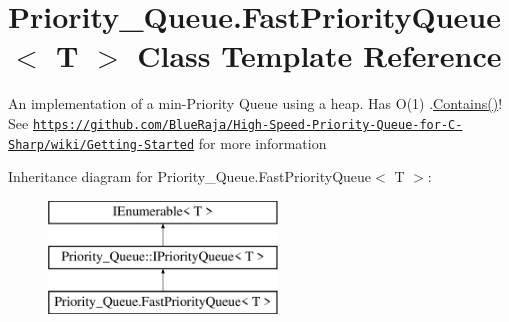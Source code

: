 \hypertarget{class_priority___queue_1_1_fast_priority_queue}{}\section{Priority\+\_\+\+Queue.\+Fast\+Priority\+Queue$<$ T $>$ Class Template Reference}
\label{class_priority___queue_1_1_fast_priority_queue}


An implementation of a min-\/\+Priority Queue using a heap. Has O(1) .\hyperlink{class_priority___queue_1_1_fast_priority_queue_ac7ed1c55afc22b9f492576675d0651c7}{Contains()}! See \href{https://github.com/BlueRaja/High-Speed-Priority-Queue-for-C-Sharp/wiki/Getting-Started}{\tt https\+://github.\+com/\+Blue\+Raja/\+High-\/\+Speed-\/\+Priority-\/\+Queue-\/for-\/\+C-\/\+Sharp/wiki/\+Getting-\/\+Started} for more information  


Inheritance diagram for Priority\+\_\+\+Queue.\+Fast\+Priority\+Queue$<$ T $>$\+:\begin{figure}[H]
\begin{center}
\leavevmode
\includegraphics[height=3.000000cm]{class_priority___queue_1_1_fast_priority_queue}
\end{center}
\end{figure}
